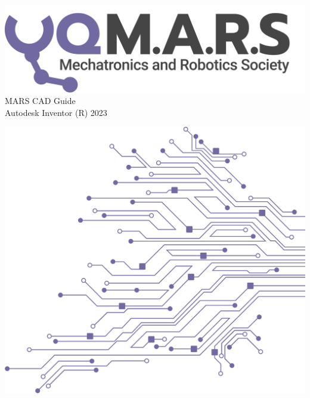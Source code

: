 \documentclass[a4paper,12pt]{report}
\begin{document}
\begin{titlepage}
    \begin{center}
        \vspace*{15mm}
        \includegraphics[width=0.7\paperwidth]{./assets/Logo (Dark).png} \\
        \vspace{1cm}
        \Huge MARS CAD Guide \\
        \huge \textcolor{turbo_purple}{Autodesk Inventor (R) 2023}
    \end{center}
    \vfill
    \includegraphics[height=0.5\paperheight, right]{./assets/Pattern - PCB (Solid).png}
    \vspace*{10mm}
\end{titlepage}
\restoregeometry
\newpage
\tableofcontents



%
    
%

%

%

%

%

%

%
\end{document}
